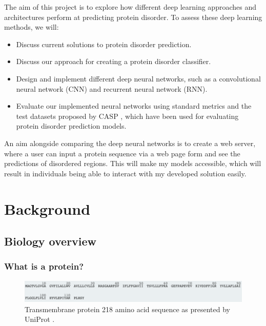 \documentclass{l4proj}
\begin{document}
The aim of this project is to explore how different deep learning approaches and architectures perform at predicting protein disorder. To assess these deep learning methods, we will: 
\begin{itemize}
    \item Discuss current solutions to protein disorder prediction.
    \item Discuss our approach for creating a protein disorder classifier.
    \item Design and implement different deep neural networks, such as a convolutional neural network (CNN) and recurrent neural network (RNN). 
    \item Evaluate our implemented neural networks using standard metrics and the test datasets proposed by CASP \citep{casp}, which have been used for evaluating protein disorder prediction models. 
\end{itemize}
An aim alongside comparing the deep neural networks is to create a web server, where a user can input a protein sequence via a web page form and see the predictions of disordered regions. This will make my models accessible, which will result in individuals being able to interact with my developed solution easily. 


\chapter{Background}
\label{chap:background}

\section{Biology overview}

\subsection{What is a protein?}

\begin{figure}
    \centering
    \includegraphics[width=\linewidth]{images/bg_seq.pdf}

    \caption{Transmembrane protein 218 amino acid sequence as presented by UniProt \citep{prot_A2RU14}.}

    \label{fig:sequence example} 
\end{figure}
\end{document}

